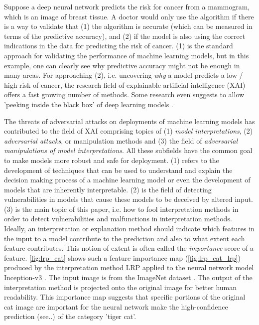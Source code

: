\documentclass[sigconf]{acmart}
\begin{document}
Suppose a deep neural network predicts the risk for cancer from a mammogram, which is an image of breast tissue. A doctor would only use the algorithm if there is a way to validate that (1) the algorithm is accurate (which can be measured in terms of the predictive accuracy), and (2) if the model is also using the correct indications in the data for predicting the risk of cancer. (1) is the standard approach for validating the performance of machine learning models, but in this example, one can clearly see why predictive accuracy might not be enough in many areas. For approaching (2), i.e. uncovering \textit{why} a model predicts a low / high risk of cancer, the research field of explainable artificial intelligence (XAI) offers a fast growing number of methods. Some research even suggests to allow 'peeking inside the black box' of deep learning models \cite{adadi2018peeking}.  


The threats of adversarial attacks on deployments of machine learning models has contributed to the field of XAI comprising topics of (1) \textit{model interpretations}, (2) \textit{adversarial attacks}, or manipulation methods and (3) the field of \textit{adversarial manipulations of model interpretations}. All these subfields have the common goal to make models more robust and safe for deployment. 
(1) refers to the development of techniques that can be used to understand and explain the decision making process of a machine learning model or even the development of models that are inherently interpretable. (2) is the field of detecting vulnerabilities in models that cause these models to be deceived by altered input. 
(3) is the main topic of this paper, i.e. how to fool interpretation methods in order to detect vulnerabilities and malfunctions in interpretation methods. 
Ideally, an interpretation or explanation method should indicate which features in the input to a model contribute to the prediction and also to what extent each feature contributes. This notion of extent is often called the \textit{importance} score of a feature. \autoref{fig:lrp_cat} shows such a feature importance map (\autoref{fig:lrp_cat_lrp}) produced by the interpretation method LRP \cite{bach2015pixel} applied to the neural network model Inception-v3 \cite{szegedy2016rethinking}. The input image is from the ImageNet dataset \cite{ILSVRC15}. The output of the interpretation method is projected onto the original image for better human readability. This importance map suggests that specific portions of the original cat image are important for the neural network make the high-confidence prediction (see..) of the category 'tiger cat'. 
\end{document}
